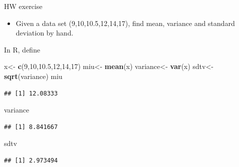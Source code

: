 \documentclass[ignorenonframetext,]{beamer}
\newenvironment{Shaded}{\begin{snugshade}}{\end{snugshade}}
\newcommand{\KeywordTok}[1]{\textcolor[rgb]{0.13,0.29,0.53}{\textbf{#1}}}
\newcommand{\DecValTok}[1]{\textcolor[rgb]{0.00,0.00,0.81}{#1}}
\newcommand{\FloatTok}[1]{\textcolor[rgb]{0.00,0.00,0.81}{#1}}
\newcommand{\StringTok}[1]{\textcolor[rgb]{0.31,0.60,0.02}{#1}}
\newcommand{\NormalTok}[1]{#1}
\providecommand{\tightlist}{%
  \setlength{\itemsep}{0pt}\setlength{\parskip}{0pt}}
\begin{document}
\begin{frame}[fragile]{HW exercise}

\begin{itemize}
\tightlist
\item
  Given a data set (9,10,10.5,12,14,17), find mean, variance and
  standard deviation by hand.
\end{itemize}

In R, define

\begin{Shaded}
\begin{Highlighting}[]
\NormalTok{x<-}\StringTok{ }\KeywordTok{c}\NormalTok{(}\DecValTok{9}\NormalTok{,}\DecValTok{10}\NormalTok{,}\FloatTok{10.5}\NormalTok{,}\DecValTok{12}\NormalTok{,}\DecValTok{14}\NormalTok{,}\DecValTok{17}\NormalTok{)}
\NormalTok{miu<-}\StringTok{ }\KeywordTok{mean}\NormalTok{(x)}
\NormalTok{variance<-}\StringTok{ }\KeywordTok{var}\NormalTok{(x)}
\NormalTok{sdtv<-}\StringTok{ }\KeywordTok{sqrt}\NormalTok{(variance)}
\NormalTok{miu}
\end{Highlighting}
\end{Shaded}

\begin{verbatim}
## [1] 12.08333
\end{verbatim}

\begin{Shaded}
\begin{Highlighting}[]
\NormalTok{variance}
\end{Highlighting}
\end{Shaded}

\begin{verbatim}
## [1] 8.841667
\end{verbatim}

\begin{Shaded}
\begin{Highlighting}[]
\NormalTok{sdtv}
\end{Highlighting}
\end{Shaded}

\begin{verbatim}
## [1] 2.973494
\end{verbatim}

\end{frame}
\end{document}
